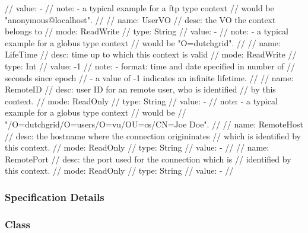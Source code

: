 \begin{myspec}
{{      //   value: -
      //   note:  - a typical example for a ftp type context 
      //            would be "anonymous@localhost".
      //
      //   name:  UserVO
      //   desc:  the VO the context belongs to
      //   mode:  ReadWrite
      //   type:  String
      //   value: -
      //   note:  - a typical example for a globus type context 
      //            would be "O=dutchgrid".
      //
      //   name:  LifeTime
      //   desc:  time up to which this context is valid
      //   mode:  ReadWrite
      //   type:  Int
      //   value: -1
      //   note:  - format: time and date specified in number of 
      //            seconds since epoch
      //          - a value of -1 indicates an infinite lifetime.
      //
      //   name:  RemoteID
      //   desc:  user ID for an remote user, who is identified
      //          by this context.
      //   mode:  ReadOnly
      //   type:  String
      //   value: -
      //   note:  - a typical example for a globus type context 
      //            would be
      //            "/O=dutchgrid/O=users/O=vu/OU=cs/CN=Joe Doe".
      //
      //   name:  RemoteHost
      //   desc:  the hostname where the connection origininates
      //          which is identified by this context.
      //   mode:  ReadOnly
      //   type:  String
      //   value: -
      //
      //   name:  RemotePort
      //   desc:  the port used for the connection which is
      //          identified by this context.
      //   mode:  ReadOnly
      //   type:  String
      //   value: -
      //
    }
  }
 \end{myspec}
 
 
 \subsubsection{Specification Details}
 
 \subsubsection*{Class }
 
